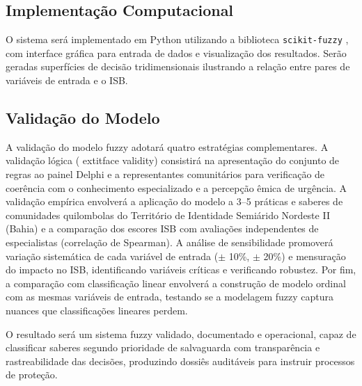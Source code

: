 \subsection{Implementação Computacional}

O sistema será implementado em Python utilizando a biblioteca \texttt{scikit-fuzzy} \cite{Warner2015}, com interface gráfica para entrada de dados e visualização dos resultados. Serão geradas superfícies de decisão tridimensionais ilustrando a relação entre pares de variáveis de entrada e o ISB.

\subsection{Validação do Modelo}

A validação do modelo fuzzy adotará quatro estratégias complementares. A validação lógica (	extit{face validity}) consistirá na apresentação do conjunto de regras ao painel Delphi e a representantes comunitários para verificação de coerência com o conhecimento especializado e a percepção êmica de urgência. A validação empírica envolverá a aplicação do modelo a 3--5 práticas e saberes de comunidades quilombolas do Território de Identidade Semiárido Nordeste II (Bahia) e a comparação dos escores ISB com avaliações independentes de especialistas (correlação de Spearman). A análise de sensibilidade promoverá variação sistemática de cada variável de entrada ($\pm$ 10\%, $\pm$ 20\%) e mensuração do impacto no ISB, identificando variáveis críticas e verificando robustez. Por fim, a comparação com classificação linear envolverá a construção de modelo ordinal com as mesmas variáveis de entrada, testando se a modelagem fuzzy captura nuances que classificações lineares perdem.

O resultado será um sistema fuzzy validado, documentado e operacional, capaz de classificar saberes segundo prioridade de salvaguarda com transparência e rastreabilidade das decisões, produzindo dossiês auditáveis para instruir processos de proteção.
